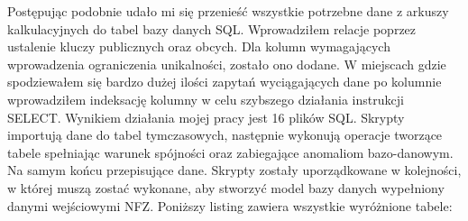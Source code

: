 Postępując podobnie udało mi się przenieść wszystkie potrzebne dane z arkuszy kalkulacyjnych do tabel bazy danych SQL. Wprowadziłem relacje poprzez ustalenie kluczy publicznych oraz obcych. Dla kolumn wymagających wprowadzenia ograniczenia unikalności, zostało ono dodane. W miejscach gdzie spodziewałem się bardzo dużej ilości zapytań wyciągających dane po kolumnie wprowadziłem indeksację kolumny w celu szybszego działania instrukcji SELECT.
Wynikiem działania mojej pracy jest 16 plików SQL. Skrypty importują dane do tabel tymczasowych, następnie wykonują operacje tworzące tabele spełniając warunek spójności oraz zabiegające anomaliom bazo-danowym. Na samym końcu przepisujące dane. Skrypty zostały uporządkowane w kolejności, w której muszą zostać wykonane, aby stworzyć model bazy danych wypełniony danymi wejściowymi NFZ. Poniższy listing zawiera wszystkie wyróżnione tabele:


